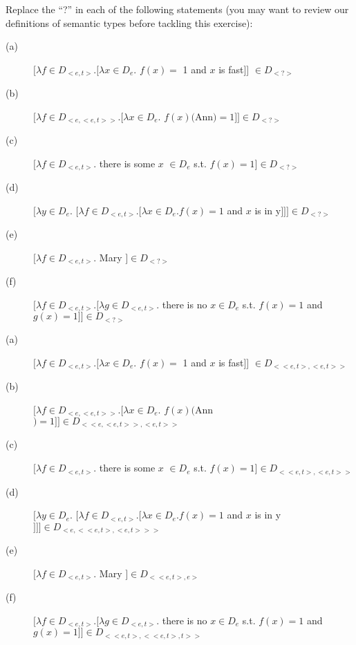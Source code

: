 \documentclass[11pt]{article}
\begin{document}
\begin{problem}{2}
Replace the ``?'' in each of the following statements (you may want to review our definitions of semantic types before tackling this exercise):

\begin{description}
    \item[(a)]$[\lambda f \in D_{<e,t>} . [\lambda x \in D_{e}.$ $f(x) =$ 1 and $x$ is fast]] $\in D_{<\textbf{?}>}$

    \item[(b)] $[\lambda f \in D_{<e,<e,t>>} . [\lambda x \in D_{e}.$ $f(x)($Ann$) = 1]] \in D_{<\textbf{?}>}$
    
    \item[(c)] $[\lambda f \in D_{<e,t>}.$ there is some $x$ $\in D_{e}$ s.t. $f(x) = 1] \in D_{<\textbf{?}>}$
    
    \item[(d)] $[\lambda y \in D_{e}.$ $[\lambda f \in D_{<e,t>} . [\lambda x \in D_{e}. f(x) =1$ and $x$ is in y$]]] \in D_{<\textbf{?}>}$
    
    \item[(e)] $[\lambda f \in D_{<e,t>}.$ Mary $] \in D_{<\textbf{?}>}$
    
    \item[(f)] $[\lambda f \in D_{<e,t>} . [\lambda g \in D_{<e,t>}.$ there is no $x \in D_{e}$ s.t. $f(x) = 1$ and $g(x) = 1]] \in D_{<\textbf{?}>}$

\end{description}

\end{problem}

\begin{solution}
\begin{description}
    \item[(a)]$[\lambda f \in D_{<e,t>} . [\lambda x \in D_{e}.$ $f(x) =$ 1 and $x$ is fast]] $\in D_{<<e, t>, <e, t>>}$

    \item[(b)] $[\lambda f \in D_{<e,<e,t>>} . [\lambda x \in D_{e}.$ $f(x)($Ann$) = 1]] \in D_{<<e, <e, t>>, <e, t>>}$
    
    \item[(c)] $[\lambda f \in D_{<e,t>}.$ there is some $x$ $\in D_{e}$ s.t. $f(x) = 1] \in D_{<<e, t>, <e, t>>}$
    
    \item[(d)] $[\lambda y \in D_{e}.$ $[\lambda f \in D_{<e,t>} . [\lambda x \in D_{e}. f(x) =1$ and $x$ is in y$]]] \in D_{<e, <<e, t>, <e, t>>>}$
    
    \item[(e)] $[\lambda f \in D_{<e,t>}.$ Mary $] \in D_{<<e, t>, e>}$
    
    \item[(f)] $[\lambda f \in D_{<e,t>} . [\lambda g \in D_{<e,t>}.$ there is no $x \in D_{e}$ s.t. $f(x) = 1$ and $g(x) = 1]] \in D_{<<e, t>, <<e,t>, t>>}$

\end{description}\end{solution}
\end{document}
